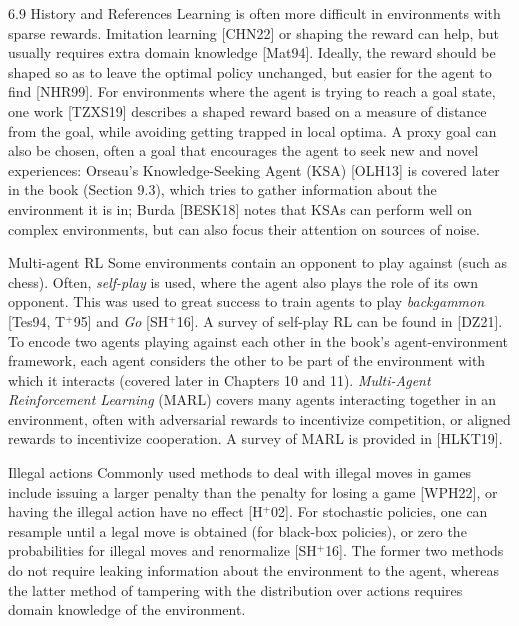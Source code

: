 \documentclass[aspectratio=169,10pt]{beamer}
\begin{document}
\begin{frame}[allowframebreaks]{6.9 History and References}
\vspace{0.1cm}
Learning is often more difficult in environments with sparse rewards.
Imitation learning [CHN22] or shaping the reward can help, but usually
requires extra domain knowledge [Mat94]. Ideally, the reward should be
shaped so as to leave the optimal policy unchanged, but easier for the
agent to find [NHR99]. For environments where the agent is trying to reach
a goal state, one work [TZXS19] describes a shaped reward based on a
measure of distance from the goal, while avoiding getting trapped in local
optima. A proxy goal can also be chosen, often a goal that encourages the
agent to seek new and novel experiences: Orseau's Knowledge-Seeking Agent
(KSA) [OLH13] is covered later in the book (Section 9.3), which tries to
gather information about the environment it is in; Burda [BESK18] notes
that KSAs can perform well on complex environments, but can also focus
their attention on sources of noise.

\framebreak

\begin{block}{Multi-agent RL}
Some environments contain an opponent to play against (such as chess).
Often, \emph{self-play} is used, where the agent also plays the role of its
own opponent. This was used to great success to train agents to play
\emph{backgammon} [Tes94, T$^{+}$95] and \emph{Go} [SH$^{+}$16]. A survey of
self-play RL can be found in [DZ21]. To encode two agents playing against
each other in the book's agent-environment framework, each agent considers
the other to be part of the environment with which it interacts (covered
later in Chapters 10 and 11). \emph{Multi-Agent Reinforcement Learning}
(MARL) covers many agents interacting together in an environment, often
with adversarial rewards to incentivize competition, or aligned rewards to
incentivize cooperation. A survey of MARL is provided in [HLKT19].
\end{block}

\begin{block}{Illegal actions}
Commonly used methods to deal with illegal moves in games include issuing a
larger penalty than the penalty for losing a game [WPH22], or having the
illegal action have no effect [H$^{+}$02]. For stochastic policies, one can
resample until a legal move is obtained (for black-box policies), or zero
the probabilities for illegal moves and renormalize [SH$^{+}$16]. The
former two methods do not require leaking information about the
environment to the agent, whereas the latter method of tampering with the
distribution over actions requires domain knowledge of the environment.
\end{block}


\end{frame}
\end{document}
